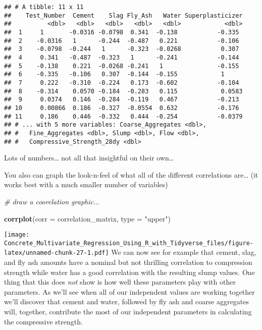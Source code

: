 \documentclass[]{article}
\newenvironment{Shaded}{\begin{snugshade}}{\end{snugshade}}
\newcommand{\CommentTok}[1]{\textcolor[rgb]{0.56,0.35,0.01}{\textit{#1}}}
\newcommand{\DataTypeTok}[1]{\textcolor[rgb]{0.13,0.29,0.53}{#1}}
\newcommand{\KeywordTok}[1]{\textcolor[rgb]{0.13,0.29,0.53}{\textbf{#1}}}
\newcommand{\NormalTok}[1]{#1}
\newcommand{\StringTok}[1]{\textcolor[rgb]{0.31,0.60,0.02}{#1}}
\begin{document}
\begin{verbatim}
## # A tibble: 11 x 11
##    Test_Number  Cement    Slag Fly_Ash   Water Superplasticizer
##          <dbl>   <dbl>   <dbl>   <dbl>   <dbl>            <dbl>
##  1     1       -0.0316 -0.0798  0.341  -0.138           -0.335 
##  2    -0.0316   1      -0.244  -0.487   0.221           -0.106 
##  3    -0.0798  -0.244   1      -0.323  -0.0268           0.307 
##  4     0.341   -0.487  -0.323   1      -0.241           -0.144 
##  5    -0.138    0.221  -0.0268 -0.241   1               -0.155 
##  6    -0.335   -0.106   0.307  -0.144  -0.155            1     
##  7     0.222   -0.310  -0.224   0.173  -0.602           -0.104 
##  8    -0.314    0.0570 -0.184  -0.283   0.115            0.0583
##  9     0.0374   0.146  -0.284  -0.119   0.467           -0.213 
## 10     0.00866  0.186  -0.327  -0.0554  0.632           -0.176 
## 11     0.186    0.446  -0.332   0.444  -0.254           -0.0379
## # ... with 5 more variables: Coarse_Aggregates <dbl>,
## #   Fine_Aggregates <dbl>, Slump <dbl>, Flow <dbl>,
## #   Compressive_Strength_28dy <dbl>
\end{verbatim}

Lots of numbers\ldots{} not all that insightful on their own\ldots{}

You also can graph the look-n-feel of what all of the different
correlations are\ldots{} (it works best with a much smaller number of
variables)

\begin{Shaded}
\begin{Highlighting}[]
  \CommentTok{# draw a coorelation graphic...}

  \KeywordTok{corrplot}\NormalTok{(}\DataTypeTok{corr   =}\NormalTok{ correlation_matrix,}
           \DataTypeTok{type   =} \StringTok{"upper"}\NormalTok{)}
\end{Highlighting}
\end{Shaded}

\texttt{[image: Concrete\_Multivariate\_Regression\_Using\_R\_with\_Tidyverse\_files/figure-latex/unnamed-chunk-27-1.pdf]}
We can now see for example that cement, slag, and fly ash amounts have a
nominal but not thrilling correlation to compression strength while
water has a good correlation with the resulting slump values. One thing
that this does \emph{not} show is how well these parameters play with
other parameters. As we'll see when all of our independent values are
working together we'll discover that cement and water, followed by fly
ash and coarse aggregates will, together, contribute the most of our
independent parameters in calculating the compressive strength.
\end{document}
